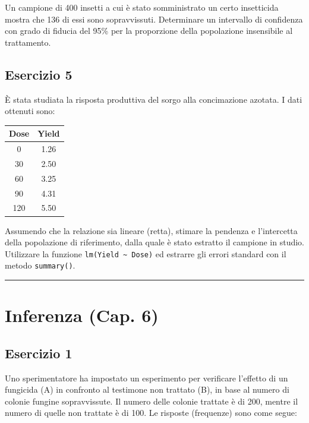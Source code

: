 \documentclass[a4paper,12pt,oneside]{book}
\begin{document}
Un campione di 400 insetti a cui è stato somministrato un certo insetticida mostra che 136 di essi sono sopravvissuti. Determinare un intervallo di confidenza con grado di fiducia del 95\% per la proporzione della popolazione insensibile al trattamento.

\hypertarget{esercizio-5-3}{%
\subsection{Esercizio 5}\label{esercizio-5-3}}

È stata studiata la risposta produttiva del sorgo alla concimazione azotata. I dati ottenuti sono:

\begin{longtable}[]{@{}cc@{}}
\toprule()
Dose & Yield \\
\midrule()
\endhead
0 & 1.26 \\
30 & 2.50 \\
60 & 3.25 \\
90 & 4.31 \\
120 & 5.50 \\
\bottomrule()
\end{longtable}

Assumendo che la relazione sia lineare (retta), stimare la pendenza e l'intercetta della popolazione di riferimento, dalla quale è stato estratto il campione in studio. Utilizzare la funzione \texttt{lm(Yield\ \textasciitilde{}\ Dose)} ed estrarre gli errori standard con il metodo \texttt{summary()}.

\begin{center}\rule{0.5\linewidth}{0.5pt}\end{center}

\hypertarget{inferenza-cap.-6}{%
\section{Inferenza (Cap. 6)}\label{inferenza-cap.-6}}

\hypertarget{esercizio-1-4}{%
\subsection{Esercizio 1}\label{esercizio-1-4}}

Uno sperimentatore ha impostato un esperimento per verificare l'effetto di un fungicida (A) in confronto al testimone non trattato (B), in base al numero di colonie fungine sopravvissute. Il numero delle colonie trattate è di 200, mentre il numero di quelle non trattate è di 100. Le risposte (frequenze) sono come segue:
\end{document}
